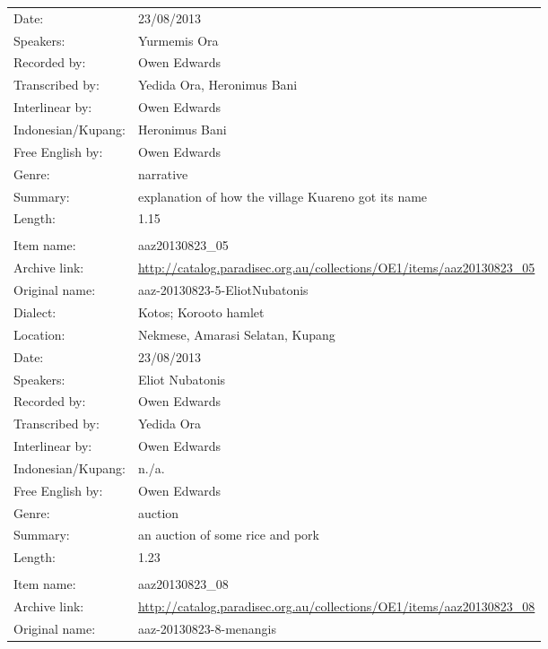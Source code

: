 \begin{longtable}{lL{.67\textwidth}}
Date:				& 23/08/2013\\
Speakers:				& Yurmemis Ora\\
Recorded by:			& Owen Edwards\\
Transcribed by:		& Yedida Ora, Heronimus Bani\\
Interlinear by:		& Owen Edwards \\
Indonesian/Kupang:		& Heronimus Bani\\
Free English by:		& Owen Edwards\\
Genre:				& narrative \\
Summary:				& explanation of how the village Kuareno{\Q} got its name\\
Length:				& 1.15\\ \lspbottomrule
			& \\
Item name:			& aaz20130823{\_}05\\
Archive link:			& \url{http://catalog.paradisec.org.au/collections/OE1/items/aaz20130823_05}\\
Original name:			& aaz-20130823-5-EliotNubatonis\\
Dialect:				& Kotos; Koro{\Q}oto hamlet \\
Location:				& Nekmese{\Q}, Amarasi Selatan, Kupang \\
Date:				& 23/08/2013\\
Speakers:				& Eliot Nubatonis\\
Recorded by:			& Owen Edwards\\
Transcribed by:		& Yedida Ora\\
Interlinear by:		& Owen Edwards \\
Indonesian/Kupang:		& n./a.\\
Free English by:		& Owen Edwards\\
Genre:				& auction\\
Summary:				& an auction of some rice and pork\\
Length:				& 1.23\\ \lspbottomrule
			& \\
Item name:			& aaz20130823{\_}08\\
Archive link:			& \url{http://catalog.paradisec.org.au/collections/OE1/items/aaz20130823_08}\\
Original name:			& aaz-20130823-8-menangis\\

\end{longtable}
